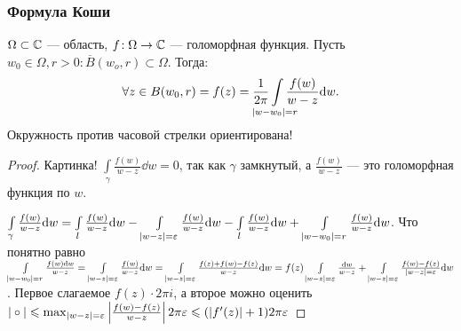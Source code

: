 \subsubsection{Формула Коши}
\begin{theorem}
    $\Omega \subset \mathbb{C}$ --- область,  $f\!: \Omega \to \mathbb{C}$ --- голоморфная функция. Пусть  $w_0 \in \Omega, r > 0\!: \overline{B}(w_o, r) \subset \Omega$. Тогда:
    \[
        \forall z \in B(w_0, r) = f(z) = \frac{1}{2\pi} \int\limits_{\mathclap{|w-w_0|=r}} \frac{f(w)}{w - z} \dd{w}
    .\] 
    Окружность против часовой стрелки ориентирована!
\end{theorem}
\begin{proof}
    Картинка! $\int\limits_\gamma \frac{f(w)}{w-z}\dd{w} = 0$, так как $\gamma$ замкнутый, а $\frac{f(w)}{w-z}$ --- это голоморфная функция по $w$. 

    $\int\limits_{\gamma} \frac{f(w)}{w-z}\mathrm{d}w = \int\limits_{l} \frac{f(w)}{w-z}\mathrm{d}w - \int\limits_{|w-z|=\varepsilon} \frac{f(w)}{w-z}\mathrm{d}w - \int\limits_{l}\frac{f(w)}{w-z}\mathrm{d}w + \int\limits_{|w-w_0|=r}\frac{f(w)}{w-z}\mathrm{d}w$. Что понятно равно $\int\limits_{|w-w_0|=r} \frac{f(w) \mathrm{d}w}{w-z} = \int\limits_{|w-z|=\varepsilon} \frac{f(w)}{w-z}\mathrm{d}w = \int\limits_{|w-z|=\varepsilon} \frac{f(z) + f(w) - f(z)}{w-z}\mathrm{d}w = f(z) \int\limits_{|w-z|=\varepsilon} \frac{\mathrm{d}w}{w-z} + \int\limits_{|w-z|=\varepsilon} \frac{f(w) - f(z)}{|w-z|=\varepsilon}\mathrm{d}w$. Первое слагаемое $f(z) \cdot 2\pi i$, а второе можно оценить $| \circ | \leqslant  \max_{|w-z|=\varepsilon} \left| \frac{f(w) - f(z)}{w - z} \right| 2\pi \varepsilon \leqslant (|f'(z)| +1) 2\pi \varepsilon$
\end{proof}

